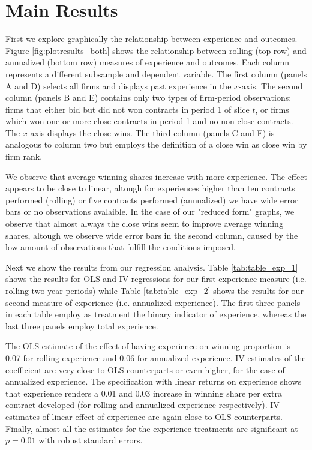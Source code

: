 \section{Main Results}

First we explore graphically the relationship between experience and outcomes. Figure \ref{fig:plotresults_both} shows the relationship between rolling (top row) and annualized (bottom row) measures of experience and outcomes.  Each column represents a different subsample and dependent variable. The first column (panels A and D) selects all firms and displays past experience in the $x$-axis. The second column (panels B and E) contains only two types of firm-period observations: firms that either bid but did not won contracts in period 1 of slice $t$, or firms which won one or more close contracts in period 1 and no non-close contracts. The $x$-axis displays the close wins. The third column (panels C and F) is analogous to column two but employs the definition of a close win as close win by firm rank.

We observe that average winning shares increase with more experience. The effect appears to be close to linear, altough for experiences higher than ten contracts performed (rolling) or five contracts performed (annualized) we have wide error bars or no observations avalaible. In the case of our "reduced form" graphs, we observe that almost always the close wins seem to improve average winning shares, altough we observe wide error bars in the second column, caused by the low amount of observations that fulfill the conditions imposed.

Next we show the results from our regression analysis. Table \ref{tab:table_exp_1} shows the results for OLS and IV regressions for our first experience measure (i.e. rolling two year periods) while Table \ref{tab:table_exp_2} shows the results for our second measure of experience (i.e. annualized experience). The first three panels in each table employ as treatment the binary indicator of experience, whereas the last three panels employ total experience.

The OLS estimate of the effect of having experience on winning proportion is 0.07 for rolling experience and 0.06 for annualized experience. IV estimates of the coefficient are very close to OLS counterparts or even higher, for the case of annualized experience. The specification with linear returns on experience shows that experience renders a 0.01 and 0.03 increase in winning share per extra contract developed (for rolling and annualized experience respectively). IV estimates of linear effect of experience are again close to OLS counterparts. Finally, almost all the estimates for the experience treatments are significant at $p=0.01$ with robust standard errors.

